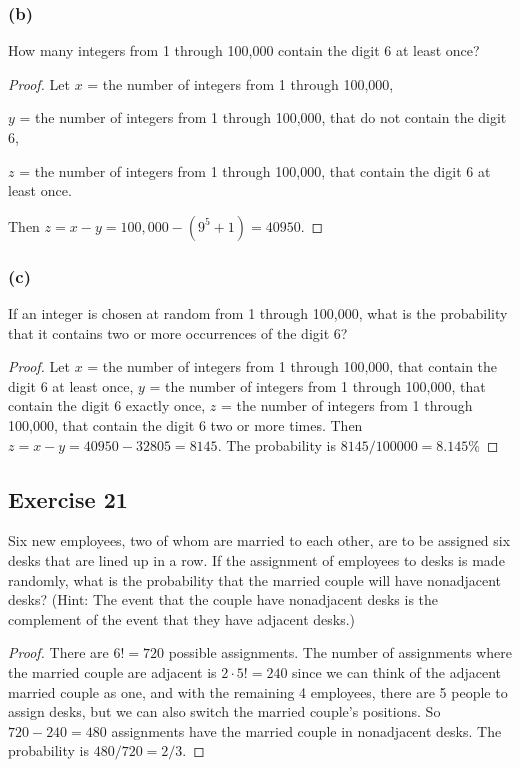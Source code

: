\documentclass[14pt]{extarticle}
\begin{document}
\subsubsection{(b)}
How many integers from 1 through 100,000 contain the digit 6 at least once?

\begin{proof}
     Let $x$ = the number of integers from 1 through 100,000,

     $y$ = the number of integers from 1 through 100,000, that do not contain the digit 6,

     $z$ = the number of integers from 1 through 100,000, that contain the digit 6 at least once.

     Then \(z = x - y = 100,000 - (9^5 + 1) = 40950\).
\end{proof}

\subsubsection{(c)}
If an integer is chosen at random from 1 through 100,000, what is the probability that it contains two or more occurrences of the digit 6?

\begin{proof}
     Let $x$ = the number of integers from 1 through 100,000, that contain the digit 6 at least once, $y$ = the number of
     integers from 1 through 100,000, that contain the digit 6 exactly once, $z$ = the number of integers from 1 through
     100,000, that contain the digit 6 two or more times. Then \(z = x - y = 40950 - 32805 = 8145\). The probability is
     \(8145 / 100000 = 8.145\%\)
\end{proof}

\subsection{Exercise 21}
Six new employees, two of whom are married to each other, are to be assigned six desks that are lined up in a row. If
the assignment of employees to desks is made randomly, what is the probability that the married couple will have
nonadjacent desks? (Hint: The event that the couple have nonadjacent desks is the complement of the event that they
have adjacent desks.)

\begin{proof}
     There are \(6! = 720\) possible assignments. The number of assignments where the married couple are adjacent is
     \(2 \cdot 5! = 240\) since we can think of the adjacent married couple as one, and with the remaining 4 employees,
     there are 5 people to assign desks, but we can also switch the married couple's positions. So \(720-240 = 480\)
     assignments have the married couple in nonadjacent desks. The probability is \(480/720 = 2/3\).
\end{proof}
\end{document}
